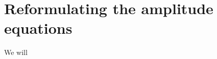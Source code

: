 \chapter{Reformulating the amplitude equations}
    \label{app:ccsd-dot-products}
    We will \cite{gauss1995coupled}

